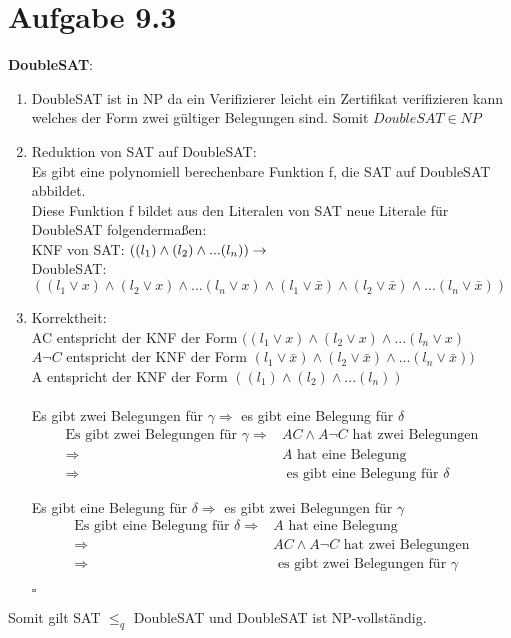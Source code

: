 \documentclass{article}
\begin{document}
	\section[a 9.3]{Aufgabe 9.3}
	\textbf{DoubleSAT}:\\
	\begin{enumerate}[label=\Roman*.]
		\item DoubleSAT ist in NP da ein Verifizierer leicht ein Zertifikat verifizieren kann welches der Form zwei gültiger Belegungen sind. Somit $DoubleSAT \in NP$
		\item Reduktion von SAT auf DoubleSAT:\\
		Es gibt eine polynomiell berechenbare Funktion f, die SAT auf DoubleSAT abbildet.\\
		Diese Funktion f bildet aus den Literalen von SAT neue Literale für DoubleSAT folgendermaßen:\\
		KNF von SAT: $((l_1) \wedge (l_2) \wedge ... (l_n))\\   \rightarrow $\\
		DoubleSAT: $ ((l_1 \vee x) \wedge (l_2 \vee x) \wedge ... (l_n \vee x) \wedge 
		(l_1 \vee \bar{x}) \wedge (l_2 \vee \bar{x}) \wedge ... (l_n \vee \bar{x}))$\\
		\item Korrektheit:\\
		AC entspricht der KNF der Form $((l_1 \vee x) \wedge (l_2 \vee x) \wedge ... (l_n \vee x)$\\
		$A\neg C$ entspricht der KNF der Form $(l_1 \vee \bar{x}) \wedge (l_2 \vee \bar{x}) \wedge ... (l_n \vee \bar{x}))$\\
		A entspricht der KNF der Form $((l_1) \wedge (l_2) \wedge ... (l_n))$
		\\\\
		Es gibt zwei Belegungen für $\gamma \Rightarrow$ es gibt eine Belegung für $\delta$\\
		\begin{equation}
		\nonumber
			\begin{split}
				\text{Es gibt zwei Belegungen für }\gamma \Rightarrow & AC \wedge A \neg C \text{ hat zwei Belegungen}\\
				\Rightarrow & A \text{ hat eine Belegung}\\
				\Rightarrow & \text{ es gibt eine Belegung für }\delta
			\end{split}
		\end{equation}
		
		Es gibt eine Belegung für $\delta \Rightarrow$ es gibt zwei Belegungen für $\gamma$\\
		\begin{equation}
		\nonumber
		\begin{split}
		\text{Es gibt eine Belegung für }\delta \Rightarrow & A \text{ hat eine Belegung}\\
		\Rightarrow & AC \wedge A\neg C \text{ hat zwei Belegungen}\\
		\Rightarrow & \text{ es gibt zwei Belegungen für }\gamma
		\end{split}
		\end{equation}
		\begin{flushright}$\square$\end{flushright}
	\end{enumerate}
	Somit gilt SAT $\leq_q$ DoubleSAT und DoubleSAT ist NP-vollständig.
	
\end{document}
